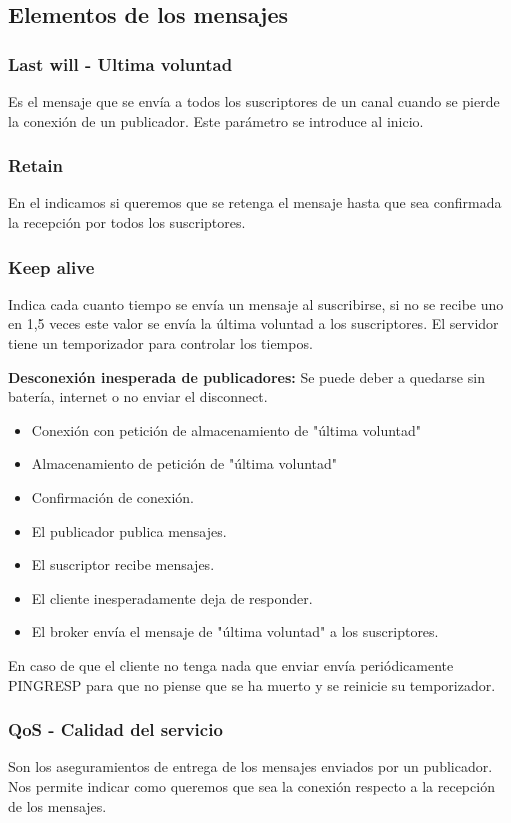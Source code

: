 \documentclass[12pt, twoside, openright]{report} %
\begin{document}
\subsection{Elementos de los mensajes}

\subsubsection{Last will - Ultima voluntad}
Es el mensaje que se envía a todos los suscriptores de un canal cuando se pierde la conexión de un publicador. Este parámetro se introduce al inicio.

\subsubsection{Retain}
En el indicamos si queremos que se retenga el mensaje hasta que sea confirmada la recepción por todos los suscriptores.

\subsubsection{Keep alive}
Indica cada cuanto tiempo se envía un mensaje al suscribirse, si no se recibe uno en 1,5 veces este valor se envía la última voluntad a los suscriptores. El servidor tiene un temporizador para controlar los tiempos.

\textbf{Desconexión inesperada de publicadores:} Se puede deber a quedarse sin batería, internet o no enviar el disconnect.
\begin{itemize}
	\item Conexión con petición de almacenamiento de "última voluntad"
	\item Almacenamiento de petición de "última voluntad"
	\item Confirmación de conexión.
	\item El publicador publica mensajes.
	\item El suscriptor recibe mensajes.
	\item El cliente inesperadamente deja de responder.
	\item El broker envía el mensaje de "última voluntad" a los suscriptores.
\end{itemize}
En caso de que el cliente no tenga nada que enviar envía periódicamente PINGRESP para que no piense que se ha muerto y se reinicie su temporizador.


\subsubsection{QoS - Calidad del servicio}
Son los aseguramientos de entrega de los mensajes enviados por un publicador. Nos permite indicar como queremos que sea la conexión respecto a la recepción de los mensajes.
\end{document}
